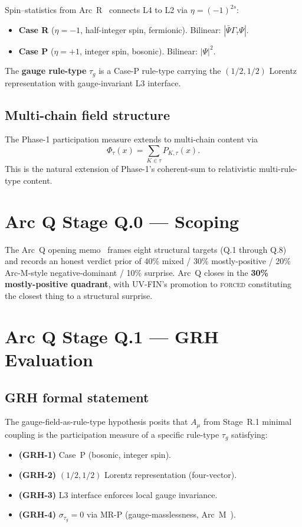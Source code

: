 \documentclass[11pt,a4paper]{article}
\begin{document}
Spin--statistics from Arc~R~\cite{arcr} connects L4 to L2 via $\eta = (-1)^{2s}$:
\begin{itemize}
  \item \textbf{Case R} ($\eta = -1$, half-integer spin, fermionic). Bilinear: $|\bar\Psi \Gamma_\tau \Psi|$.
  \item \textbf{Case P} ($\eta = +1$, integer spin, bosonic). Bilinear: $|\Psi|^2$.
\end{itemize}
The \textbf{gauge rule-type} $\tau_g$ is a Case-P rule-type carrying the $(1/2, 1/2)$ Lorentz representation with gauge-invariant L3 interface.

\subsection{Multi-chain field structure}

The Phase-1 participation measure extends to multi-chain content via
\begin{equation}
\Phi_\tau(x) = \sum_{K \in \tau} P_{K,\tau}(x).
\end{equation}
This is the natural extension of Phase-1's coherent-sum to relativistic multi-rule-type content.

\section{Arc Q Stage Q.0 --- Scoping}

The Arc~Q opening memo~\cite{q0scope} frames eight structural targets (Q.1 through Q.8) and records an honest verdict prior of 40\% mixed / 30\% mostly-positive / 20\% Arc-M-style negative-dominant / 10\% surprise. Arc~Q closes in the \textbf{30\% mostly-positive quadrant}, with UV-FIN's promotion to \textsc{forced} constituting the closest thing to a structural surprise.

\section{Arc Q Stage Q.1 --- GRH Evaluation}

\subsection{GRH formal statement}

The gauge-field-as-rule-type hypothesis posits that $A_\mu$ from Stage~R.1 minimal coupling is the participation measure of a specific rule-type $\tau_g$ satisfying:
\begin{itemize}
  \item \textbf{(GRH-1)} Case~P (bosonic, integer spin).
  \item \textbf{(GRH-2)} $(1/2, 1/2)$ Lorentz representation (four-vector).
  \item \textbf{(GRH-3)} L3 interface enforces local gauge invariance.
  \item \textbf{(GRH-4)} $\sigma_{\tau_g} = 0$ via MR-P (gauge-masslessness, Arc~M~\cite{arcm}).
\end{itemize}
\end{document}
